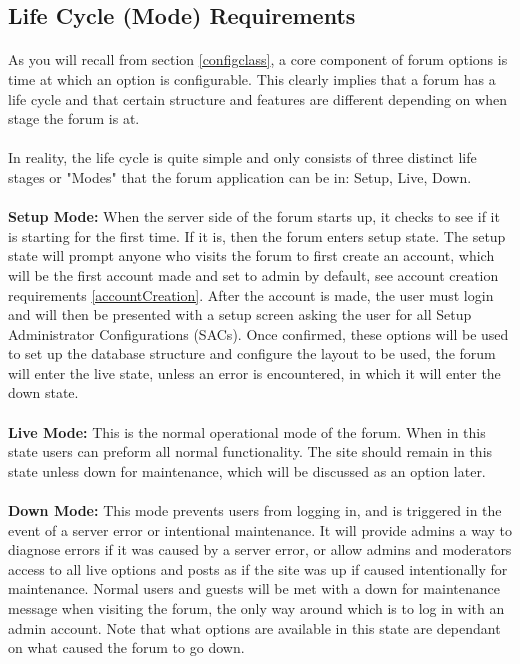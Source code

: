 \documentclass[]{article}
\begin{document}
\subsection{Life Cycle (Mode) Requirements}
\paragraph{}
As you will recall from section \ref{configclass}, a core component of forum options is time at which an option is configurable. This clearly implies that a forum has a life cycle and that certain structure and features are different depending on when stage the forum is at.
\paragraph{}
In reality, the life cycle is quite simple and only consists of three distinct life stages or "Modes" that the forum application can be in: Setup, Live, Down.
\paragraph{}
\textbf{Setup Mode:}
When the server side of the forum starts up, it checks to see if it is starting for the first time. If it is, then the forum enters setup state. The setup state will prompt anyone who visits the forum to first create an account, which will be the first account made and set to admin by default, see account creation requirements \ref{accountCreation}. After the account is made, the user must login and will then be presented with a setup screen asking the user for all Setup Administrator Configurations (SACs). Once confirmed, these options will be used to set up the database structure and configure the layout to be used, the forum will enter the live state, unless an error is encountered, in which it will enter the down state.
\paragraph{}
\textbf{Live Mode:}
This is the normal operational mode of the forum. When in this state users can preform all normal functionality. The site should remain in this state unless down for maintenance, which will be discussed as an option later.   
\paragraph{}
\textbf{Down Mode:}
This mode prevents users from logging in, and is triggered in the event of a server error or intentional maintenance. It will provide admins a way to diagnose errors if it was caused by a server error, or allow admins and moderators access to all live options and posts as if the site was up if caused intentionally for maintenance. Normal users and guests will be met with a down for maintenance message when visiting the forum, the only way around which is to log in with an admin account. Note that what options are available in this state are dependant on what caused the forum to go down.
\end{document}
